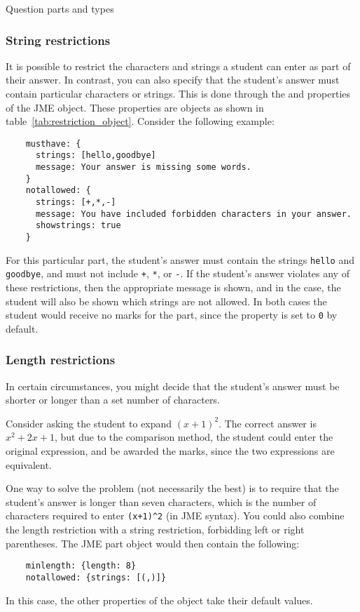 \begin{chapter}{\label{cha:question_parts}Question parts and types}
  \subsubsection{\label{sec:string_restrictions}String restrictions}
  It is possible to restrict the characters and strings a student can enter as
  part of their answer.  In contrast, you can also specify that the student's
  answer must contain particular characters or strings.  This is done through
  the  and  properties of the JME
   object.  These properties are 
  objects as shown in table~\ref{tab:restriction_object}.  Consider the
  following example:
  \begin{Verbatim}
    musthave: {
      strings: [hello,goodbye]
      message: Your answer is missing some words.
    }
    notallowed: {
      strings: [+,*,-]
      message: You have included forbidden characters in your answer.
      showstrings: true
    }
  \end{Verbatim}
  For this particular part, the student's answer must contain the strings
  \verb"hello" and \verb"goodbye", and must not include \verb"+", \verb"*", or
  \verb"-".  If the student's answer violates any of these restrictions, then
  the appropriate message is shown, and in the  case, the
  student will also be shown which strings are not allowed.  In both cases the
  student would receive no marks for the part, since the
   property is set to \verb"0" by default.

  \subsubsection{\label{sec:length_restrictions}Length restrictions}
  In certain circumstances, you might decide that the student's answer must be
  shorter or longer than a set number of characters.
  
  Consider asking the student to expand $(x+1)^{2}$.  The correct answer is
  $x^{2}+2x+1$, but due to the comparison method, the student could enter the
  original expression, and be awarded the marks, since the two expressions are
  equivalent.
 
  One way to solve the problem (not necessarily the best) is to require that
  the student's answer is longer than seven characters, which is the number of
  characters required to enter \verb"(x+1)^2" (in JME syntax).  You could also
  combine the length restriction with a string restriction, forbidding left or
  right parentheses.  The JME part object would then contain the following:
  \begin{Verbatim}
    minlength: {length: 8}
    notallowed: {strings: [(,)]}
  \end{Verbatim}
  In this case, the other properties of the  object
  take their default values.


\end{chapter}
